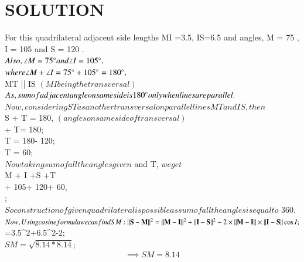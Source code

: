 \documentclass[journal,12pt,twocolumn]{IEEEtran}
\begin{document}
\section{SOLUTION}
For this quadrilateral adjacent side lengths MI =3.5, IS=6.5
and angles, \angle M = 75 \degree, \angle I = 105 \degree and \angle S = 120 \degree.
\\
$Also, \angle M = 75 \degree and \angle I = 105\degree,$
\\
$where  \angle M +\angle I = 75\degree + 105\degree =180\degree,$
\\
 \implies MT || IS $(MI being the transversal)$
\\
$ As, sum of adjacent angle on same side is 180\degree only when lines are parallel.$
\\
$ Now, considering ST as another transversal on parallel lines MT and IS , then $
\\
 \angle S + \angle T = 180\degree, $(angles on same side of transversal) $
\\
 \degree + \angle T= 180\degree;
\\
 \implies\angle T = 180\degree - 120\degree;
\\
 \implies \angle T = 60\degree;
\\
$ Now taking sum of all the angles given $ and \angle T, $ we get $
\\
\implies  \angle M + \angle I +\angle S +\angle T
\\
\degree + 105\degree + 120\degree + 60\degree,
\\
\degree; 
\\
$ So construction of given quadrilateral is possible as sum of all the angles is equal to $ 360\degree.
\\
$ Now,Using cosine formula we can find SM:
\\
{\Vert\mathbf{S}-\mathbf{M}\rVert^2}={ {\Vert\mathbf{M}-\mathbf{I}\rVert^2}+ \Vert\mathbf{I}-\mathbf{S}\rVert^2-{2\times\Vert\mathbf{M}-\mathbf{I}\rVert\times \Vert\mathbf{I}-\mathbf{S}\rVert\cos{I}}};$
\\
={3.5^2+6.5^2-{2\times \cos{105\degree}}};
\\
\implies$SM= \sqrt{8.14*8.14};$
\begin{align}
 \implies SM=8.14
\end{align}
\end{document}
